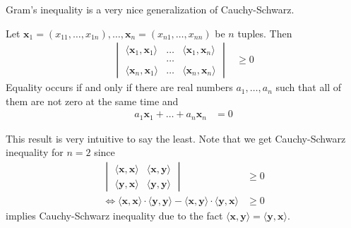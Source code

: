 \documentclass{subfile}
\begin{document}
	Gram's inequality is a very nice generalization of Cauchy-Schwarz.
		\begin{theorem}
			Let $\mathbf{x}_1=(x_{11},\ldots,x_{1n}),\ldots,\mathbf{x}_n=(x_{n1},\ldots,x_{nn})$ be $n$ tuples. Then
				\begin{align*}
					\begin{vmatrix}
						\langle \mathbf{x}_1,\mathbf{x}_1\rangle & \ldots & \langle \mathbf{x}_1,\mathbf{x}_n\rangle\\
						& \ldots & \\
						\langle \mathbf{x}_n,\mathbf{x}_1\rangle & \ldots & \langle \mathbf{x}_n,\mathbf{x}_n\rangle
					\end{vmatrix}
						& \geq0
				\end{align*}
			Equality occurs if and only if there are real numbers $a_1,\ldots,a_n$ such that all of them are not zero at the same time and
				\begin{align*}
					a_1\mathbf{x}_1+\ldots+a_n\mathbf{x}_n
						& = 0
				\end{align*}
		\end{theorem}
	This result is very intuitive to say the least. Note that we get Cauchy-Schwarz inequality for $n=2$ since
		\begin{align*}
			\begin{vmatrix}
				\langle\mathbf{x},\mathbf{x}\rangle & \langle\mathbf{x},\mathbf{y}\rangle\\
				\langle\mathbf{y},\mathbf{x}\rangle & \langle\mathbf{y},\mathbf{y}\rangle
			\end{vmatrix}
				& \geq0\\
			\iff\langle\mathbf{x},\mathbf{x}\rangle\cdot\langle\mathbf{y},\mathbf{y}\rangle-\langle\mathbf{x},\mathbf{y}\rangle\cdot\langle\mathbf{y},\mathbf{x}\rangle
				& \geq0
		\end{align*}
	implies Cauchy-Schwarz inequality due to the fact $\langle\mathbf{x},\mathbf{y}\rangle=\langle\mathbf{y},\mathbf{x}\rangle$.
\end{document}
